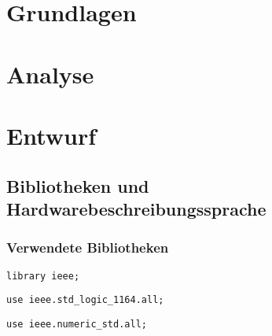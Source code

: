 



 

 \tableofcontents
 
 
 
 
 
 
 
 \chapter{Grundlagen}
 
 
 
 
  
 
 
  
 
 
 
 
 
 
 \chapter{Analyse}
 
 
 
 
 
 

 
 
 
\chapter{Entwurf}
\section{Bibliotheken und Hardwarebeschreibungssprache}
\subsection{Verwendete Bibliotheken}

\texttt{library ieee;}

\texttt{use ieee.std\_logic\_1164.all;}

\texttt{use ieee.numeric\_std.all;}

